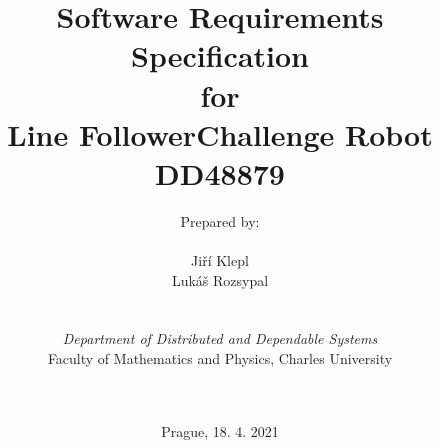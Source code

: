 \def\Company{Faculty of Mathematics and Physics, Charles University}
\def\Institute{\textit{Department of Distributed and Dependable Systems}}
\def\Course{\textit{}}
\def\Module{\textit{ }}
\def\Docent{\textit{}}
\def\Assistant{\textit{}}

\def\BoldTitle{Software Requirements Specification}

\def\Subtitle{for \\ Line FollowerChallenge Robot DD48879 \\}
\def\Authors{Prepared by:\\\\ Jiří Klepl \\ Lukáš Rozsypal } 
\def\Shortname{J.Klepl; L.Rozsypal}


\title{\textbf{\BoldTitle}\\\Subtitle}
\author{\Authors \\ \\ \\ \Institute\\ \Company\\ \Module\\ \Docent\\ \Assistant}
\date{Prague, 18. 4. 2021}

